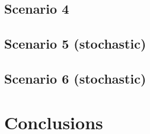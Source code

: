 \documentclass[a4paper]{article}
\begin{document}
    \subsection{Scenario 4}

    \subsection{Scenario 5 (stochastic)}

    \subsection{Scenario 6 (stochastic)}

    \section{Conclusions}
\end{document}
